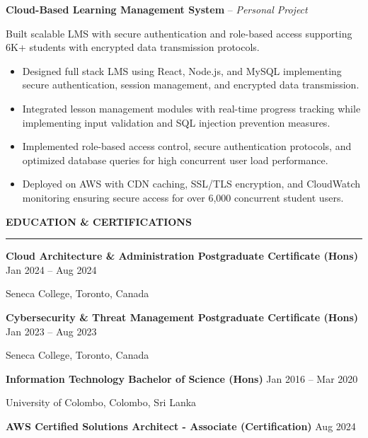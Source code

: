 \documentclass[10pt,letterpaper]{article}
\begin{document}
\textbf{Cloud-Based Learning Management System} -- \emph{Personal Project}

\vspace{-1pt}

Built scalable LMS with secure authentication and role-based access supporting 6K+ students with encrypted data transmission protocols.
\vspace{-1pt}
\begin{itemize}
\item Designed full stack LMS using React, Node.js, and MySQL implementing secure authentication, session management, and encrypted data transmission.
\item Integrated lesson management modules with real-time progress tracking while implementing input validation and SQL injection prevention measures.
\item Implemented role-based access control, secure authentication protocols, and optimized database queries for high concurrent user load performance.
\item Deployed on AWS with CDN caching, SSL/TLS encryption, and CloudWatch monitoring ensuring secure access for over 6,000 concurrent student users.
\end{itemize}

\vspace{6pt}

\textbf{EDUCATION \& CERTIFICATIONS}\\[-8pt]
\noindent\rule{\textwidth}{1pt}

\vspace{-2pt}

\textbf{Cloud Architecture \& Administration Postgraduate Certificate (Hons)} \hfill Jan 2024 -- Aug 2024

Seneca College, Toronto, Canada

\textbf{Cybersecurity \& Threat Management Postgraduate Certificate (Hons)} \hfill Jan 2023 -- Aug 2023

Seneca College, Toronto, Canada

\textbf{Information Technology Bachelor of Science (Hons)} \hfill Jan 2016 -- Mar 2020

University of Colombo, Colombo, Sri Lanka

\textbf{AWS Certified Solutions Architect - Associate (Certification)} \hfill Aug 2024
\end{document}
